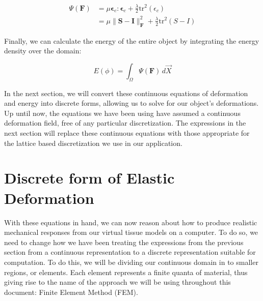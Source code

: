 \begin{equation}
  \label{equ:corotatedelasticity}
  \begin{split}
   \Psi(\mathbf{F}) &= \mu \bm \epsilon_c : \bm \epsilon_c + \frac \lambda 2
   \text{tr}^2(\epsilon_c)\\ &= \mu \lVert \bm S - \bm I \rVert^2_{\bm
     F} + \frac \lambda 2
   \text{tr}^2(S-I)
   \end{split}
\end{equation}

Finally, we can calculate the energy of the entire object by
integrating the energy density over the domain:

\begin{equation}
  \label{equ:systemenergy}
  E(\phi) = \int_\Omega \Psi( \mathbf F ) \,d\vec{X}
\end{equation}

In the next section, we will convert these continuous equations of
deformation and energy into discrete forms, allowing us to solve for
our object's deformations. Up until now, the equations we have been
using have assumed a continuous deformation field, free of any
particular discretization. The expressions in the next section will
replace these continuous equations with those appropriate for the
lattice based discretization we use in our application.

\section{Discrete form of Elastic Deformation}
\label{sec:engineering:solving}

With these equations in hand, we can now reason about how to produce
realistic mechanical responses from our virtual tissue models on a
computer. To do so, we need to change how we have been treating the
expressions from the previous section from a continuous representation
to a discrete representation suitable for computation. To do this, we
will be dividing our continuous domain in to smaller regions, or
elements. Each element represents a finite quanta of material, thus
giving rise to the name of the approach we will be using throughout
this document: Finite Element Method (FEM).

